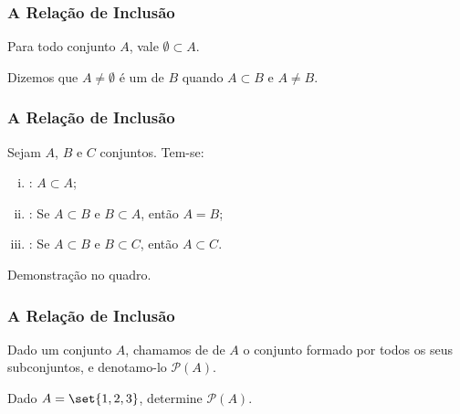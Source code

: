 
\begin{frame}
\frametitle{A Relação de Inclusão} %

\begin{proposicao}
Para todo conjunto $A$, vale $\emptyset \subset A$.
\end{proposicao}

\begin{definicao}
Dizemos que $A \neq \emptyset$ é um  de $B$
quando $A \subset B$  e $A \neq B$.
\end{definicao}



\end{frame}



\begin{frame}
\frametitle{A Relação de Inclusão} %
\begin{proposicao}
Sejam $A$, $B$ e $C$ conjuntos. Tem-se:
\begin{enumerate}[i.]
	\item {}: $A \subset A$;
	\item {}: Se $A \subset B$ e $B \subset A$,
	então $A = B$;
	\item {}: Se $A \subset B$ e $B \subset C$,
	então $A \subset C$.
\end{enumerate}
\end{proposicao}

Demonstração no quadro.


\end{frame}


\begin{frame}
\frametitle{A Relação de Inclusão} %

\begin{definicao}
Dado um conjunto $A$, chamamos de  de $A$ o conjunto formado por todos
os seus subconjuntos, e denotamo-lo $\mathcal{P}(A)$.
\end{definicao}

\begin{exemplo}
Dado $A = \set {1, 2, 3}$, determine $\mathcal{P}(A)$.
\end{exemplo}



\end{frame}